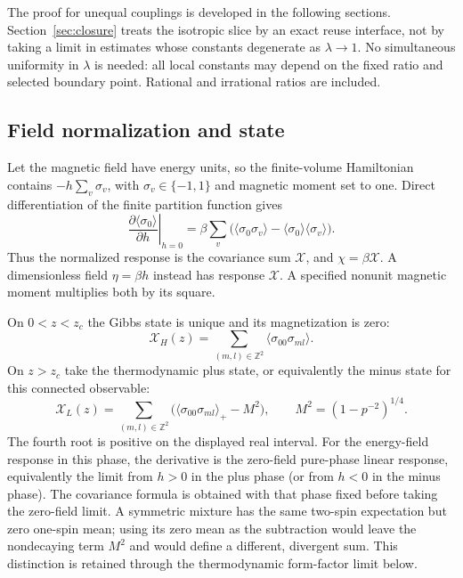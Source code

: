 \documentclass[11pt]{article}
\numberwithin{equation}{section}
\theoremstyle{definition}
\newcommand{\Z}{\mathbb Z}
\newcommand{\XH}{\mathcal X_H}
\newcommand{\XL}{\mathcal X_L}
\begin{document}
The proof for unequal couplings is developed in the following sections.
Section~\ref{sec:closure} treats the isotropic slice by an exact reuse
interface, not by taking a limit in estimates whose constants degenerate
as $\lambda\to1$. No simultaneous uniformity in $\lambda$ is needed:
all local constants may depend on the fixed ratio and selected boundary
point. Rational and irrational ratios are included.

\subsection{Field normalization and state}
Let the magnetic field have energy units, so the finite-volume Hamiltonian
contains $-h\sum_v\sigma_v$, with $\sigma_v\in\{-1,1\}$ and magnetic
moment set to one. Direct differentiation of the finite partition
function gives
\[
 \left.\frac{\partial\langle\sigma_0\rangle}{\partial h}\right|_{h=0}
 =\beta\sum_v\bigl(\langle\sigma_0\sigma_v\rangle
                         -\langle\sigma_0\rangle\langle\sigma_v\rangle\bigr).
\]
Thus the normalized response is the covariance sum $\mathcal X$, and
$\chi=\beta\mathcal X$. A dimensionless field $\eta=\beta h$ instead
has response $\mathcal X$. A specified nonunit magnetic moment multiplies
both by its square.

On $0<z<z_c$ the Gibbs state is unique and its magnetization is zero:
\[
 \XH(z)=\sum_{(m,l)\in\Z^2}\langle\sigma_{00}\sigma_{ml}\rangle.
\]
On $z>z_c$ take the thermodynamic plus state, or equivalently the minus
state for this connected observable:
\[
 \XL(z)=\sum_{(m,l)\in\Z^2}
       \bigl(\langle\sigma_{00}\sigma_{ml}\rangle_+-M^2\bigr),
 \qquad M^2=(1-p^{-2})^{1/4}.
\]
The fourth root is positive on the displayed real interval.
For the energy-field response in this phase, the derivative is the
zero-field pure-phase linear response, equivalently the limit from
$h>0$ in the plus phase (or from $h<0$ in the minus phase).
The covariance formula is obtained with that phase fixed before taking
the zero-field limit. A symmetric
mixture has the same two-spin expectation but zero one-spin mean; using
its zero mean as the subtraction would leave the nondecaying term $M^2$
and would define a different, divergent sum. This distinction is retained
through the thermodynamic form-factor limit below.
\end{document}
